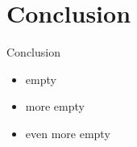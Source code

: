 \section{Conclusion}
\begin{frame}{Conclusion}
%
  \begin{minipage}[c][3cm]{\textwidth}
    \begin{itemize}\itemfill
      \item empty
      \item more empty
      \item even more empty
    \end{itemize}
  \end{minipage}
%
\end{frame}
